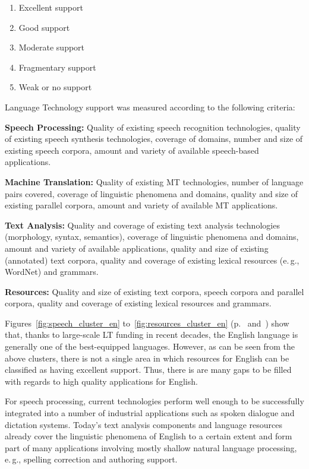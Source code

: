\documentclass[]{../../metanetpaper}
\begin{document}
\begin{multicols}{2}
\begin{enumerate}
\item Excellent support
\item Good support
\item Moderate support
\item Fragmentary support
\item Weak or no support
\end{enumerate}

Language Technology support was measured according to the following criteria:

\textbf{Speech Processing:} Quality of existing speech recognition technologies, quality of existing speech synthesis technologies, coverage of domains, number and size of existing speech corpora, amount and variety of available speech-based applications.

\textbf{Machine Translation:} Quality of existing MT technologies, number of language pairs covered, coverage of linguistic phenomena and domains, quality and size of existing parallel corpora, amount and variety of available MT applications.

\textbf{Text Analysis:} Quality and coverage of existing text analysis technologies (morphology, syntax, semantics), coverage of linguistic phenomena and domains, amount and variety of available applications, quality and size of existing (annotated) text corpora, quality and coverage of existing lexical resources (e.\,g., WordNet) and grammars.

\textbf{Resources:} Quality and size of existing text corpora, speech corpora and parallel corpora, quality and coverage of existing lexical resources and grammars.

Figures~\ref{fig:speech_cluster_en} to~\ref{fig:resources_cluster_en} (p.~\pageref{fig:speech_cluster_en} and~\pageref{fig:resources_cluster_en}) show that, thanks to large-scale LT funding in recent decades, the English language is generally one of the best-equipped languages. However, as can be seen from the above clusters, there is not a single area in which resources for English can be classified as having excellent support. Thus, there is are many gaps to be filled with regards to high quality applications for English.

For speech processing, current technologies perform well enough to be successfully integrated into a number of industrial applications such as spoken dialogue and dictation systems. Today's text analysis components and language resources already cover the linguistic phenomena of English to a certain extent and form part of many applications involving mostly shallow natural language processing, e.\,g., spelling correction and authoring support.


\end{multicols}
\end{document}
